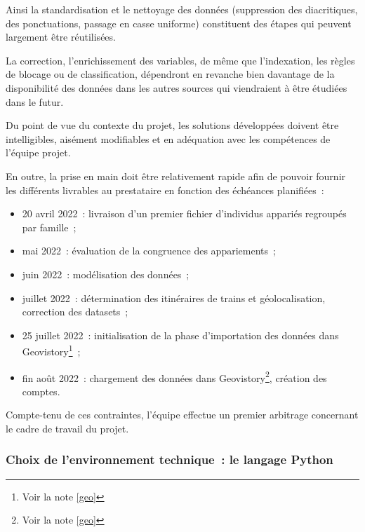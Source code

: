\documentclass[a4paper,12pt,twoside]{book}
\begin{document}
	               Ainsi la standardisation et le nettoyage des données (suppression des diacritiques, des ponctuations, passage en casse uniforme) constituent des étapes qui peuvent largement être réutilisées.
	               
	               La correction, l'enrichissement des variables, de même que l'indexation, les règles de blocage ou de classification, dépendront en revanche bien davantage de la disponibilité des données dans les autres sources qui viendraient à être étudiées dans le futur.
	               \newline
	               
	               Du point de vue du contexte du projet, les solutions développées doivent être intelligibles, aisément modifiables et en adéquation avec les compétences de l'équipe projet.
	               
	               En outre, la prise en main doit être relativement rapide afin de pouvoir fournir les différents livrables au prestataire en fonction des échéances planifiées~:
	               \vspace{0.8em}
	               \begin{itemize}
	                   \item 20 avril 2022~: livraison d'un premier fichier d'individus appariés regroupés par famille~;
	                   \item mai 2022~: évaluation de la congruence des appariements~;
	                   \item juin 2022~: modélisation des données~;
	                   \item juillet 2022~: détermination des itinéraires de trains et géolocalisation, correction des datasets~;
	                   \item 25 juillet 2022~: initialisation de la phase d'importation des données dans Geovistory\footnote{Voir la note \ref{geo}}~;
	                   \item fin août 2022~: chargement des données dans Geovistory\footnote{Voir la note \ref{geo}}, création des comptes.
	               \end{itemize}
	               \vspace{0.8em}
	               
	               Compte-tenu de ces contraintes, l'équipe effectue un premier arbitrage concernant le cadre de travail du projet.
	               
	           \subsubsection{Choix de l'environnement technique~: le langage Python}    
	               
\end{document}
